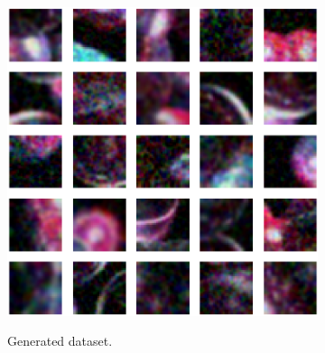 \documentclass[letterpaper]{article} %
\begin{document}
\begin{figure}[h!]
\centering
\begin{subfigure}{0.22\textwidth}
\begin{center}
\begin{minipage}[t]{0.95\linewidth}
\begin{centering}
{\includegraphics[width=\linewidth]{frame_samplesxrange.png}}
\caption{Generated dataset.}
\label{fig:frame_dataset}
\end{centering}
\end{minipage}
\end{center}
\end{subfigure}
\begin{subfigure}{0.22\textwidth}
\begin{center}
\begin{minipage}[t]{0.95\linewidth}
\begin{centering}

\end{centering}
\end{minipage}
\end{center}
\end{subfigure}
\end{figure}
\end{document}
